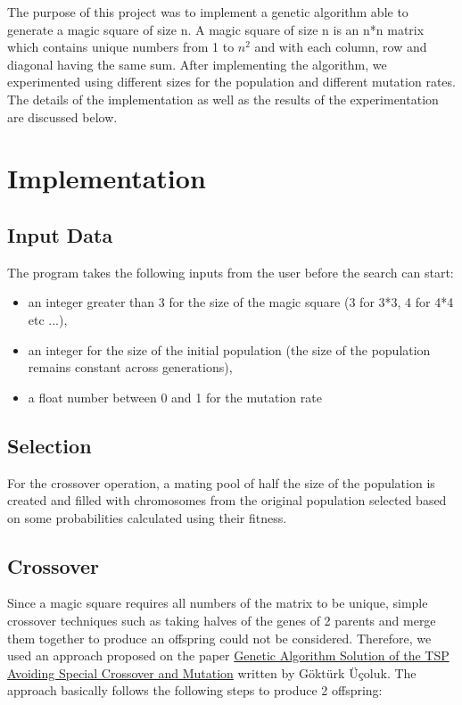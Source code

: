 \documentclass[12pt]{article}
\begin{document}
	The purpose of this project was to implement a genetic algorithm able to generate a magic square of size n. A magic square of size n is an n*n matrix which contains unique numbers from 1 to $n^2$ and with each column, row and diagonal having the same sum. After implementing the algorithm, we experimented using different sizes for the population and different mutation rates. The details of the implementation as well as the results of the experimentation are discussed below.
	
	\section{Implementation}
		\subsection{Input Data}
			The program takes the following inputs from the user before the search can start:
			\begin{itemize}
				\item an integer greater than 3 for the size of the magic square (3 for 3*3, 4 for 4*4 etc ...),
				\item an integer for the size of the initial population (the size of the population remains constant across generations),
				\item a float number between 0 and 1 for the mutation rate
			\end{itemize}
		
		\subsection{Selection}
			For the crossover operation, a mating pool of half the size of the population is created and filled with chromosomes from the original population selected based on some probabilities calculated using their fitness.
		\subsection{Crossover}
			Since a magic square requires all numbers of the matrix to be unique, simple crossover techniques such as taking halves of the genes of 2 parents and merge them together to produce an offspring could not be considered. Therefore, we used an approach proposed on the paper \href{http://www.ceng.metu.edu.tr/~ucoluk/research/publications/tspnew.pdf}{Genetic Algorithm Solution of the TSP Avoiding Special Crossover and Mutation} written by Göktürk Üçoluk. The approach basically follows the following steps to produce 2 offspring:
			
\end{document}
